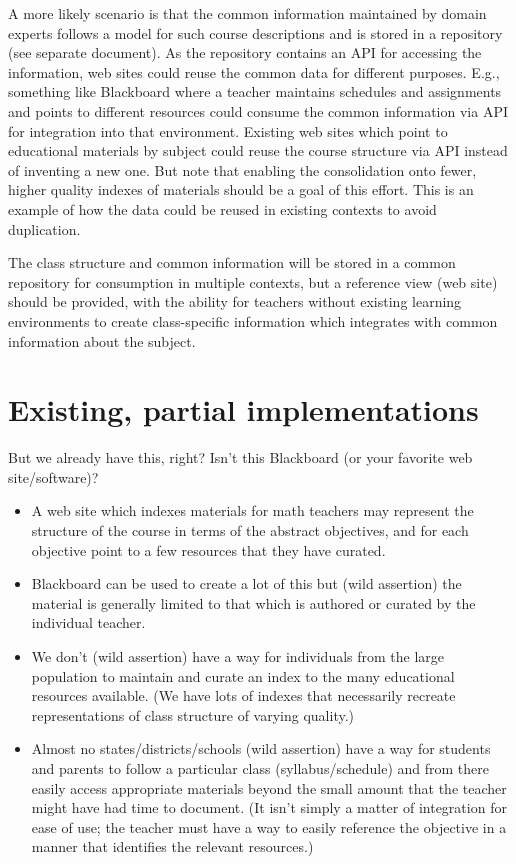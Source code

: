 A more likely scenario is that the common information maintained by domain
experts follows a model for such course descriptions and is stored in a
repository (see separate document).  As the repository contains an API
for accessing the information, web sites could reuse the common data for
different purposes.  E.g., something like Blackboard where a teacher maintains
schedules and assignments and points to different resources could consume
the common information via API for integration into that environment.
Existing web sites which point to educational materials by subject could
reuse the course structure via API instead of inventing a new one.  But
note that enabling the consolidation onto fewer, higher quality indexes of
materials should be a goal of this effort.  This is an example of how the
data could be reused in existing contexts to avoid duplication.

The class structure and common information will be stored in a common
repository for consumption in multiple contexts, but a reference view (web
site) should be provided, with the ability for teachers without existing
learning environments to create class-specific information which integrates
with common information about the subject.

\section*{Existing, partial implementations}

But we already have this, right?  Isn't this Blackboard (or your favorite
web site/software)?

\begin{itemize}
\item A web site which indexes materials for math teachers may represent the structure
of the course in terms of the abstract objectives, and for each objective point
to a few resources that they have curated.
\item Blackboard can be used to create a lot of this but (wild assertion) the
material is generally limited to that which is authored or curated by the
individual teacher.
\item We don't (wild assertion) have a way for individuals from the large population to maintain and curate
an index to the many educational resources available.  (We have lots of indexes that
necessarily recreate representations of class structure of varying quality.)
\item Almost no states/districts/schools (wild assertion) have a way
for students and parents to follow a particular class (syllabus/schedule) and
from there easily access appropriate materials beyond the small amount that the
teacher might have had time to document.  (It isn't simply a matter of integration
for ease of use; the teacher must have a way to easily reference the objective in 
a manner that identifies the relevant resources.)
\end{itemize}


